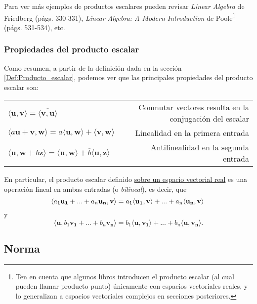 \vspace{3mm}

Para ver más ejemplos de productos escalares pueden revisar \emph{Linear Algebra} de Friedberg (págs. 330-331), \textit{Linear Algebra: A Modern Introduction} de Poole\footnote{Ten en cuenta que algunos libros introducen el producto escalar (al cual pueden llamar producto punto) únicamente con espacios vectoriales reales, y lo generalizan a espacios vectoriales complejos en secciones posteriores.} (págs. 531-534), etc.


\subsubsection{Propiedades del producto escalar} \label{Prop:Producto_escalar}

Como resumen, a partir de la definición dada en la sección \ref{Def:Producto_escalar}, podemos ver que las principales propiedades del producto escalar son:

\begin{center}
    \begin{tabular}{lr}
        $\langle\mathbf{u},\mathbf{v}\rangle = \overline{\langle\mathbf{v},\mathbf{u}\rangle}$ & Conmutar vectores resulta en la conjugación del escalar \\
        $\langle a\mathbf{u}+\mathbf{v},\mathbf{w}\rangle = a\langle\mathbf{u},\mathbf{w}\rangle + \langle\mathbf{v},\mathbf{w}\rangle$ & Linealidad en la primera entrada\\
        $\langle\mathbf{u},\mathbf{w}+b\mathbf{z}\rangle = \langle\mathbf{u},\mathbf{w}\rangle + \overline{b}\langle\mathbf{u},\mathbf{z}\rangle$ & Antilinealidad en la segunda entrada\\
    \end{tabular}{}
\end{center}{}

En particular, el producto escalar definido \underline{sobre un espacio vectorial real} es una operación lineal en ambas entradas (o \emph{bilineal}), es decir, que $$\langle a_1\mathbf{u_1}+...+a_n\mathbf{u_n},\mathbf{v}\rangle=a_1\langle\mathbf{u_1},\mathbf{v}\rangle+...+a_n\langle\mathbf{u_n},\mathbf{v}\rangle\hspace{1mm}$$ \noindent y $$\langle\mathbf{u},b_1\mathbf{v_1}+...+b_n\mathbf{v_n}\rangle=b_1\langle\mathbf{u},\mathbf{v_1}\rangle+...+b_n\langle\mathbf{u},\mathbf{v_n}\rangle.$$

\newpage
\subsection{Norma} \label{Subsec:Norma}

